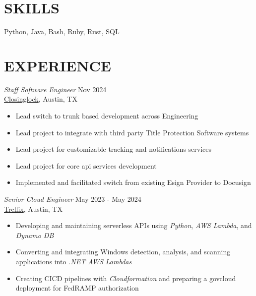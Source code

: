 \documentclass[margin, 9pt]{res} %
\begin{document}
\begin{resume}

\section{SKILLS}

Python, Java, Bash, Ruby, Rust, SQL
 
\section{EXPERIENCE}
{\sl Staff Software Engineer} \hfill Nov 2024 \\
\href{https://www.closinglock.com/}{Closinglock}, Austin, TX
\begin{itemize}
    \item Lead switch to trunk based development across Engineering
    \item Lead project to integrate with third party Title Protection Software systems
    \item Lead project for customizable tracking and notifications services
    \item Lead project for core api services development
    \item Implemented and facilitated switch from existing Esign Provider to Docusign
\end{itemize}


{\sl Senior Cloud Engineer} \hfill May 2023 - May 2024 \\
\href{https://www.trellix.com/}{Trellix}, Austin, TX
\begin{itemize}
    \item Developing and maintaining serverless APIs using {\it Python}, {\it AWS Lambda}, and {\it Dynamo DB}
    \item Converting and integrating Windows detection, analysis, and scanning applications into {\it .NET} {\it AWS Lambdas}
    \item Creating CICD pipelines with {\it Cloudformation} and preparing a govcloud deployment for FedRAMP authorization
\end{itemize}



\end{resume}
\end{document}
